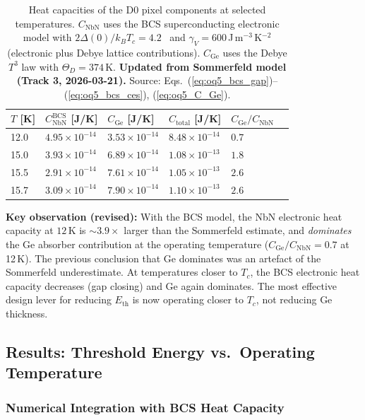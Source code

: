 \begin{table}[ht]
\centering
\caption{Heat capacities of the D0 pixel components at selected
temperatures. $C_\mathrm{NbN}$ uses the BCS superconducting electronic
model with $2\Delta(0)/k_BT_c = 4.2$~\cite{Kamlapure2010}
and $\gamma_V = 600$\,J\,m$^{-3}$\,K$^{-2}$
(electronic plus Debye lattice contributions).
$C_\mathrm{Ge}$ uses the Debye $T^3$ law with $\Theta_D = 374$\,K.
\textbf{Updated from Sommerfeld model (Track 3, 2026-03-21).}
Source: Eqs.~(\ref{eq:oq5_bcs_gap})--(\ref{eq:oq5_bcs_ces}), (\ref{eq:oq5_C_Ge}).}
\label{tab:oq5_heat_cap}
\small
\begin{tabular}{@{}llllll@{}}
\toprule
$T$ [K] & $C_\mathrm{NbN}^\mathrm{BCS}$ [J/K] & $C_\mathrm{Ge}$ [J/K] &
$C_\mathrm{total}$ [J/K] & $C_\mathrm{Ge}/C_\mathrm{NbN}$ \\
\midrule
12.0 & $4.95 \times 10^{-14}$ & $3.53 \times 10^{-14}$ &
  $8.48 \times 10^{-14}$ & $0.7$ \\
15.0 & $3.93 \times 10^{-14}$ & $6.89 \times 10^{-14}$ &
  $1.08 \times 10^{-13}$ & $1.8$ \\
15.5 & $2.91 \times 10^{-14}$ & $7.61 \times 10^{-14}$ &
  $1.05 \times 10^{-13}$ & $2.6$ \\
15.7 & $3.09 \times 10^{-14}$ & $7.90 \times 10^{-14}$ &
  $1.10 \times 10^{-13}$ & $2.6$ \\
\bottomrule
\end{tabular}
\end{table}

\textbf{Key observation (revised):} With the BCS model, the NbN
electronic heat capacity at $12$\,K is $\sim\!3.9\times$ larger than
the Sommerfeld estimate, and \emph{dominates} the Ge absorber
contribution at the operating temperature ($C_\mathrm{Ge}/C_\mathrm{NbN}
= 0.7$ at 12\,K). The previous conclusion that Ge dominates was an
artefact of the Sommerfeld underestimate. At temperatures closer to
$T_c$, the BCS electronic heat capacity decreases (gap closing) and
Ge again dominates. The most effective design lever for reducing
$E_\mathrm{th}$ is now operating closer to $T_c$, not reducing Ge
thickness.

\subsection{Results: Threshold Energy vs.\ Operating Temperature}
\label{sec:oq5_results}

\subsubsection{Numerical Integration with BCS Heat Capacity}

